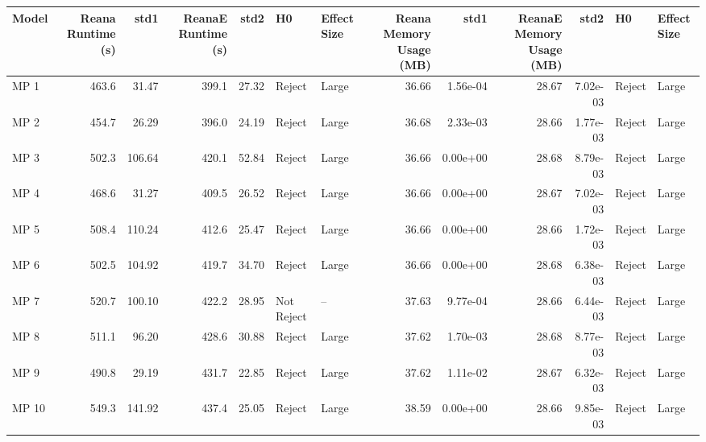 \begin{tabular}{lrrrrllrrrrll}
\toprule
 Model &  Reana Runtime (s) &    std1 &  ReanaE Runtime (s) &   std2 &          H0 & Effect Size &  Reana Memory Usage (MB) &      std1 &  ReanaE Memory Usage (MB) &      std2 &      H0 & Effect Size \\
\midrule
  MP 1 &              463.6 &   31.47 &               399.1 &  27.32 &      Reject &       Large &                    36.66 &  1.56e-04 &                     28.67 &  7.02e-03 &  Reject &       Large \\
  MP 2 &              454.7 &   26.29 &               396.0 &  24.19 &      Reject &       Large &                    36.68 &  2.33e-03 &                     28.66 &  1.77e-03 &  Reject &       Large \\
  MP 3 &              502.3 &  106.64 &               420.1 &  52.84 &      Reject &       Large &                    36.66 &  0.00e+00 &                     28.68 &  8.79e-03 &  Reject &       Large \\
  MP 4 &              468.6 &   31.27 &               409.5 &  26.52 &      Reject &       Large &                    36.66 &  0.00e+00 &                     28.67 &  7.02e-03 &  Reject &       Large \\
  MP 5 &              508.4 &  110.24 &               412.6 &  25.47 &      Reject &       Large &                    36.66 &  0.00e+00 &                     28.66 &  1.72e-03 &  Reject &       Large \\
  MP 6 &              502.5 &  104.92 &               419.7 &  34.70 &      Reject &       Large &                    36.66 &  0.00e+00 &                     28.68 &  6.38e-03 &  Reject &       Large \\
  MP 7 &              520.7 &  100.10 &               422.2 &  28.95 &  Not Reject &          -- &                    37.63 &  9.77e-04 &                     28.66 &  6.44e-03 &  Reject &       Large \\
  MP 8 &              511.1 &   96.20 &               428.6 &  30.88 &      Reject &       Large &                    37.62 &  1.70e-03 &                     28.68 &  8.77e-03 &  Reject &       Large \\
  MP 9 &              490.8 &   29.19 &               431.7 &  22.85 &      Reject &       Large &                    37.62 &  1.11e-02 &                     28.67 &  6.32e-03 &  Reject &       Large \\
 MP 10 &              549.3 &  141.92 &               437.4 &  25.05 &      Reject &       Large &                    38.59 &  0.00e+00 &                     28.66 &  9.85e-03 &  Reject &       Large \\

\end{tabular}
